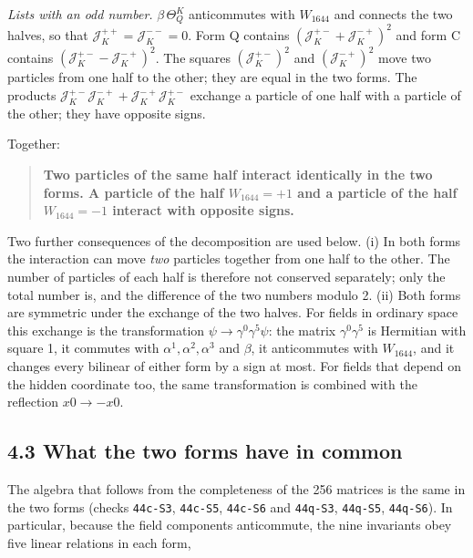 \documentclass[
  10pt,
]{article}
\begin{document}
\emph{Lists with an odd number.} \(\beta\,\Theta_Q^K\) anticommutes with
\(W_{1644}\) and connects the two halves, so that
\(\mathcal J_K^{++}=\mathcal J_K^{--}=0\). Form Q contains
\((\mathcal J_K^{+-}+\mathcal J_K^{-+})^2\) and form C contains
\((\mathcal J_K^{+-}-\mathcal J_K^{-+})^2\). The squares
\((\mathcal J_K^{+-})^2\) and \((\mathcal J_K^{-+})^2\) move two
particles from one half to the other; they are equal in the two forms.
The products
\(\mathcal J_K^{+-}\mathcal J_K^{-+}+\mathcal J_K^{-+}\mathcal J_K^{+-}\)
exchange a particle of one half with a particle of the other; they have
opposite signs.

Together:

\begin{quote}
\textbf{Two particles of the same half interact identically in the two
forms. A particle of the half \(W_{1644}=+1\) and a particle of the half
\(W_{1644}=-1\) interact with opposite signs.}
\end{quote}

Two further consequences of the decomposition are used below. (i) In
both forms the interaction can move \emph{two} particles together from
one half to the other. The number of particles of each half is therefore
not conserved separately; only the total number is, and the difference
of the two numbers modulo 2. (ii) Both forms are symmetric under the
exchange of the two halves. For fields in ordinary space this exchange
is the transformation \(\psi\to\gamma^0\gamma^5\psi\): the matrix
\(\gamma^0\gamma^5\) is Hermitian with square 1, it commutes with
\(\alpha^1,\alpha^2,\alpha^3\) and \(\beta\), it anticommutes with
\(W_{1644}\), and it changes every bilinear of either form by a sign at
most. For fields that depend on the hidden coordinate too, the same
transformation is combined with the reflection \(x0\to-x0\).

\hypertarget{what-the-two-forms-have-in-common}{%
\subsection{4.3 What the two forms have in
common}\label{what-the-two-forms-have-in-common}}

The algebra that follows from the completeness of the 256 matrices is
the same in the two forms (checks \texttt{44c-S3}, \texttt{44c-S5},
\texttt{44c-S6} and \texttt{44q-S3}, \texttt{44q-S5}, \texttt{44q-S6}).
In particular, because the field components anticommute, the nine
invariants obey five linear relations in each form,
\end{document}
